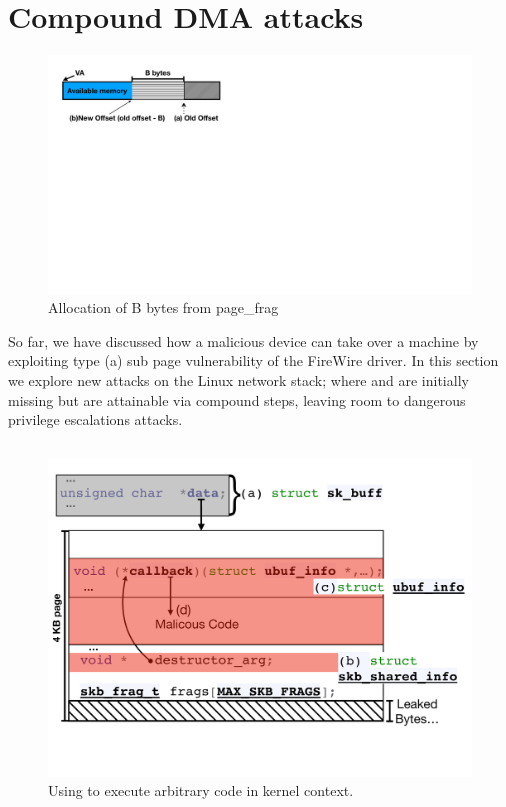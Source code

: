 \section{Compound DMA attacks}\label{sec:linux_net}
\begin{figure}
    \centering
    \includegraphics[width=1\linewidth]{figs/page_frag.pdf}
    \caption{Allocation of B bytes from page\_frag}
    \label{fig:page_frags}
\end{figure}

So far, we have discussed how a malicious device can take over a machine by exploiting type (a) sub page vulnerability of the FireWire driver. In this section we explore new attacks on the Linux network stack; where \means{} and \oportunity{} 
are initially missing but are attainable via compound steps, leaving room to dangerous privilege escalations attacks.

\subsection{\shinfo}
\begin{figure}[t]
    \centering
    \includegraphics[width=\linewidth]{figs/ubuf.pdf}
    \caption{Using \shinfo{} to execute arbitrary code in kernel context.}
    \label{fig:sh_info}
\end{figure}

